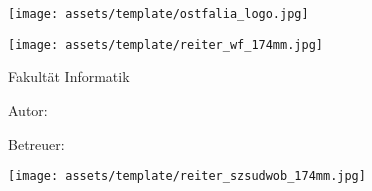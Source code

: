 \frontmatter
\begin{titlepage}
	\thispagestyle{titlepage}
	
	\hfill
	\texttt{[image: assets/template/ostfalia\_logo.jpg]}
	
	\texttt{[image: assets/template/reiter\_wf\_174mm.jpg]}
	
	\hspace{1cm}
	\begin{minipage}{\dimexpr\textwidth-1.5cm\relax}
		{\Large\textsf{Fakultät Informatik}}
	\end{minipage}
	
	\vfil
	

	\hspace{1cm}
	\begin{minipage}{\dimexpr\textwidth-1.5cm\relax}
		\hrulefill
		
		\vspace{2em}
		
		{\Large\textbf{\textsf{\DocumentSubject}}}
			
		\vspace{2em}
			
		{\Huge\textbf{\textsf{\DocumentTitle}}}
			
		\vspace{2em}
			
		{\Large\textsf{\DocumentSubtitle}}
		
		\vspace{1em}
		
		\hrulefill
	\end{minipage}	


	\vfil
	
	\hspace{1cm}
	\begin{minipage}{\dimexpr\textwidth-1.5cm\relax}
		{\Large\textsf{Autor: \DocumentAuthor}}
		
		\vspace{0.5cm}		
		
		{\Large\textsf{Betreuer: \DocumentTutor}}
	\end{minipage}
	
	\vspace{2em}
	
	
	\enlargethispage{10\baselineskip}
	
	\texttt{[image: assets/template/reiter\_szsudwob\_174mm.jpg]}
\end{titlepage}

\restoregeometry
